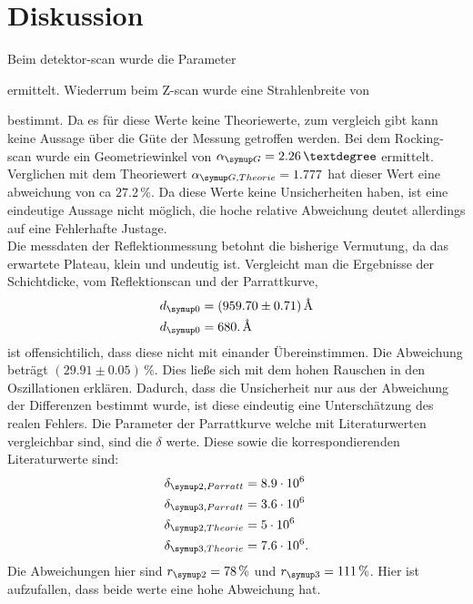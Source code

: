 \section{Diskussion}
Beim detektor-scan wurde die Parameter 

ermittelt. Wiederrum beim Z-scan wurde eine Strahlenbreite von 
 
bestimmt. Da es für diese Werte keine Theoriewerte, zum vergleich gibt kann keine Aussage über die Güte der Messung getroffen werden.
Bei dem Rocking-scan wurde ein Geometriewinkel von $\alpha\idx{G} = 2.26\,°$ ermittelt. Verglichen mit dem Theoriewert $\alpha\idx{G, Theorie} = 1.777$
hat dieser Wert eine abweichung von ca $27.2\,\%$. Da diese Werte keine Unsicherheiten haben, ist eine eindeutige Aussage nicht möglich,
die hoche relative Abweichung deutet allerdings auf eine Fehlerhafte Justage.\\
Die messdaten der Reflektionmessung betohnt die bisherige Vermutung, da das erwartete Plateau, klein und undeutig ist. Vergleicht man 
die Ergebnisse der Schichtdicke, vom Reflektionscan und der Parrattkurve, 
\begin{equation}
\begin{aligned}
    d\idx{0} &= (959.70 \pm 0.71)\,\si{\angstrom} \\
    d\idx{0} &= 680.\,\si{\angstrom} \\
\end{aligned}
\end{equation}
ist offensichtilich, dass diese nicht mit einander Übereinstimmen. Die Abweichung beträgt $(29.91 \pm0.05)\,\%$. Dies ließe sich mit dem 
hohen Rauschen in den Oszillationen erklären. Dadurch, dass die Unsicherheit nur aus der Abweichung der Differenzen bestimmt wurde,
ist diese eindeutig eine Unterschätzung des realen Fehlers.
Die Parameter der Parrattkurve welche mit Literaturwerten \cite{V44} vergleichbar sind, sind die $\delta$ werte. Diese sowie die 
korrespondierenden Literaturwerte sind:
\begin{equation}
    \begin{aligned}
        \delta\idx{2, Parratt} &= 8.9\cdot 10^{6} \\
        \delta\idx{3, Parratt} &= 3.6\cdot 10^{6} \\
        \delta\idx{2, Theorie} &= 5\cdot 10^{6} \\
        \delta\idx{3, Theorie} &= 7.6\cdot 10^{6}. \\
    \end{aligned}
\end{equation}
Die Abweichungen hier sind $r\idx{2} = 78\,\%$ und $r\idx{3} = 111\,\%$. Hier ist aufzufallen, dass beide werte eine hohe Abweichung hat.
